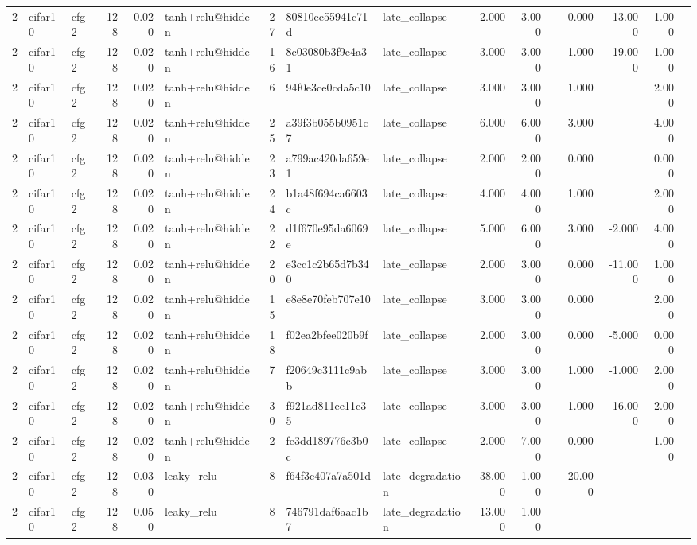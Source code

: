 \begin{table}[htbp]
{\begin{tabular}{@{}rllrrlrllrrrrrrr@{}}
2 & cifar10 & cfg2 & 128 & 0.020 & tanh+relu@hidden & 27 & 80810ec55941c71d & late\_collapse & 2.000 & 3.000 &  & 0.000 & -13.000 & 1.000 &  \\
2 & cifar10 & cfg2 & 128 & 0.020 & tanh+relu@hidden & 16 & 8c03080b3f9e4a31 & late\_collapse & 3.000 & 3.000 &  & 1.000 & -19.000 & 1.000 &  \\
2 & cifar10 & cfg2 & 128 & 0.020 & tanh+relu@hidden & 6 & 94f0e3ce0cda5c10 & late\_collapse & 3.000 & 3.000 &  & 1.000 &  & 2.000 &  \\
2 & cifar10 & cfg2 & 128 & 0.020 & tanh+relu@hidden & 25 & a39f3b055b0951c7 & late\_collapse & 6.000 & 6.000 &  & 3.000 &  & 4.000 &  \\
2 & cifar10 & cfg2 & 128 & 0.020 & tanh+relu@hidden & 23 & a799ac420da659e1 & late\_collapse & 2.000 & 2.000 &  & 0.000 &  & 0.000 &  \\
2 & cifar10 & cfg2 & 128 & 0.020 & tanh+relu@hidden & 24 & b1a48f694ca6603c & late\_collapse & 4.000 & 4.000 &  & 1.000 &  & 2.000 &  \\
2 & cifar10 & cfg2 & 128 & 0.020 & tanh+relu@hidden & 22 & d1f670e95da6069e & late\_collapse & 5.000 & 6.000 &  & 3.000 & -2.000 & 4.000 &  \\
2 & cifar10 & cfg2 & 128 & 0.020 & tanh+relu@hidden & 20 & e3cc1c2b65d7b340 & late\_collapse & 2.000 & 3.000 &  & 0.000 & -11.000 & 1.000 &  \\
2 & cifar10 & cfg2 & 128 & 0.020 & tanh+relu@hidden & 15 & e8e8e70feb707e10 & late\_collapse & 3.000 & 3.000 &  & 0.000 &  & 2.000 &  \\
2 & cifar10 & cfg2 & 128 & 0.020 & tanh+relu@hidden & 18 & f02ea2bfee020b9f & late\_collapse & 2.000 & 3.000 &  & 0.000 & -5.000 & 0.000 &  \\
2 & cifar10 & cfg2 & 128 & 0.020 & tanh+relu@hidden & 7 & f20649c3111c9abb & late\_collapse & 3.000 & 3.000 &  & 1.000 & -1.000 & 2.000 &  \\
2 & cifar10 & cfg2 & 128 & 0.020 & tanh+relu@hidden & 30 & f921ad811ee11c35 & late\_collapse & 3.000 & 3.000 &  & 1.000 & -16.000 & 2.000 &  \\
2 & cifar10 & cfg2 & 128 & 0.020 & tanh+relu@hidden & 2 & fe3dd189776c3b0c & late\_collapse & 2.000 & 7.000 &  & 0.000 &  & 1.000 &  \\
2 & cifar10 & cfg2 & 128 & 0.030 & leaky\_relu & 8 & f64f3c407a7a501d & late\_degradation & 38.000 & 1.000 &  & 20.000 &  &  &  \\
2 & cifar10 & cfg2 & 128 & 0.050 & leaky\_relu & 8 & 746791daf6aac1b7 & late\_degradation & 13.000 & 1.000 &  &  &  &  &  \\

\end{tabular}}
\end{table}
